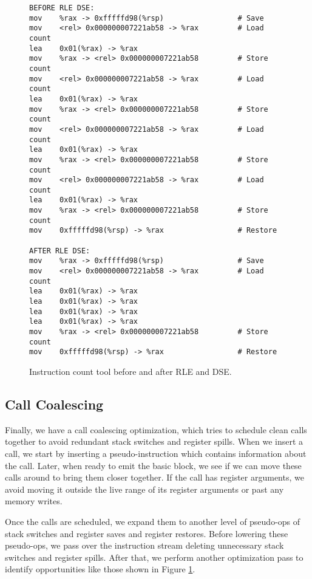 \begin{figure}
\begin{verbatim}
BEFORE RLE DSE:
mov    %rax -> 0xfffffd98(%rsp)                 # Save
mov    <rel> 0x000000007221ab58 -> %rax         # Load count
lea    0x01(%rax) -> %rax 
mov    %rax -> <rel> 0x000000007221ab58         # Store count
mov    <rel> 0x000000007221ab58 -> %rax         # Load count
lea    0x01(%rax) -> %rax 
mov    %rax -> <rel> 0x000000007221ab58         # Store count
mov    <rel> 0x000000007221ab58 -> %rax         # Load count
lea    0x01(%rax) -> %rax 
mov    %rax -> <rel> 0x000000007221ab58         # Store count
mov    <rel> 0x000000007221ab58 -> %rax         # Load count
lea    0x01(%rax) -> %rax 
mov    %rax -> <rel> 0x000000007221ab58         # Store count
mov    0xfffffd98(%rsp) -> %rax                 # Restore

AFTER RLE DSE:
mov    %rax -> 0xfffffd98(%rsp)                 # Save
mov    <rel> 0x000000007221ab58 -> %rax         # Load count
lea    0x01(%rax) -> %rax 
lea    0x01(%rax) -> %rax 
lea    0x01(%rax) -> %rax 
lea    0x01(%rax) -> %rax 
mov    %rax -> <rel> 0x000000007221ab58         # Store count
mov    0xfffffd98(%rsp) -> %rax                 # Restore
\end{verbatim}
\caption{Instruction count tool before and after RLE and DSE.}
\label{fig:rle_and_dse}
\end{figure}

\subsection{Call Coalescing}

Finally, we have a call coalescing optimization, which tries to schedule clean
calls together to avoid redundant stack switches and register spills.  When we
insert a call, we start by inserting a pseudo-instruction which contains
information about the call.  Later, when ready to emit the basic block, we see
if we can move these calls around to bring them closer together.  If the call
has register arguments, we avoid moving it outside the live range of its
register arguments or past any memory writes.

Once the calls are scheduled, we expand them to another level of pseudo-ops of
stack switches and register saves and register restores.  Before lowering these
pseudo-ops, we pass over the instruction stream deleting unnecessary stack
switches and register spills.  After that, we perform another optimization pass
to identify opportunities like those shown in Figure \ref{fig:rle_and_dse}.

